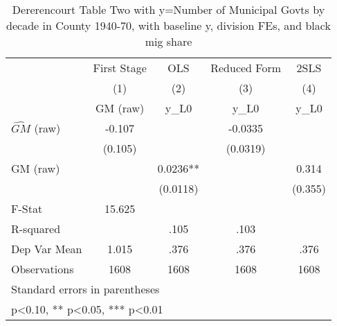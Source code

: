 \begin{table}[htbp]\centering
\def\sym#1{\ifmmode^{#1}\else\(^{#1}\)\fi}
\caption{Dererencourt Table Two with y=Number of Municipal Govts by decade in County 1940-70, with baseline y, division FEs, and black mig share}
\begin{tabular}{l*{4}{c}}
\toprule
                    & First Stage   &         OLS   &Reduced Form   &        2SLS   \\
                    &\multicolumn{1}{c}{(1)}&\multicolumn{1}{c}{(2)}&\multicolumn{1}{c}{(3)}&\multicolumn{1}{c}{(4)}\\
                    &\multicolumn{1}{c}{GM  (raw)}&\multicolumn{1}{c}{y\_L0}&\multicolumn{1}{c}{y\_L0}&\multicolumn{1}{c}{y\_L0}\\
\midrule
$\hat{GM}$ (raw)    &      -0.107   &               &     -0.0335   &               \\
                    &     (0.105)   &               &    (0.0319)   &               \\
\addlinespace
GM  (raw)           &               &      0.0236** &               &       0.314   \\
                    &               &    (0.0118)   &               &     (0.355)   \\
\midrule
F-Stat              &      15.625   &               &               &               \\
R-squared           &               &        .105   &        .103   &               \\
Dep Var Mean        &       1.015   &        .376   &        .376   &        .376   \\
Observations        &        1608   &        1608   &        1608   &        1608   \\
\bottomrule
\multicolumn{5}{l}{\footnotesize Standard errors in parentheses}\\
\multicolumn{5}{l}{\footnotesize * p<0.10, ** p<0.05, *** p<0.01}\\
\end{tabular}
\end{table}
